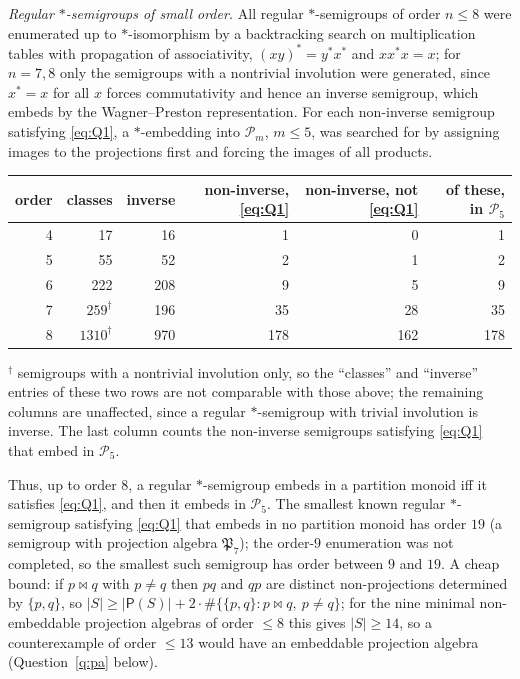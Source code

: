 \documentclass[11pt]{amsart}
\theoremstyle{definition}
\renewcommand{\P}{\mathcal{P}}      %
\newcommand{\PA}{\mathsf{P}}         %
\newcommand{\mt}{\bowtie}      %
\begin{document}
\emph{Regular $*$-semigroups of small order.} All regular $*$-semigroups of order $n\le8$ were enumerated up to $*$-isomorphism by a backtracking search on multiplication tables with propagation of associativity, $(xy)^*=y^*x^*$ and $xx^*x=x$; for $n=7,8$ only the semigroups with a nontrivial involution were generated, since $x^*=x$ for all $x$ forces commutativity and hence an inverse semigroup, which embeds by the Wagner--Preston representation. For each non-inverse semigroup satisfying \eqref{eq:Q1}, a $*$-embedding into $\P_m$, $m\le5$, was searched for by assigning images to the projections first and forcing the images of all products.
\begin{center}
\begin{tabular}{@{}rrrrrr@{}}
\toprule
order & classes & inverse & non-inverse, \eqref{eq:Q1} & non-inverse, not \eqref{eq:Q1} & of these, in $\P_5$\\
\midrule
4 & 17 & 16 & 1 & 0 & 1\\
5 & 55 & 52 & 2 & 1 & 2\\
6 & 222 & 208 & 9 & 5 & 9\\
7 & $259^{\dagger}$ & 196 & 35 & 28 & 35\\
8 & $1310^{\dagger}$ & 970 & 178 & 162 & 178\\
\bottomrule
\end{tabular}

\smallskip
{\small $^\dagger$ semigroups with a nontrivial involution only, so the ``classes'' and ``inverse'' entries of these two rows are not comparable with those above; the remaining columns are unaffected, since a regular $*$-semigroup with trivial involution is inverse. The last column counts the non-inverse semigroups satisfying \eqref{eq:Q1} that embed in $\P_5$.}
\end{center}
Thus, up to order $8$, a regular $*$-semigroup embeds in a partition monoid iff it satisfies \eqref{eq:Q1}, and then it embeds in $\P_5$. The smallest known regular $*$-semigroup satisfying \eqref{eq:Q1} that embeds in no partition monoid has order $19$ (a semigroup with projection algebra $\mathfrak P_7$); the order-$9$ enumeration was not completed, so the smallest such semigroup has order between $9$ and $19$. A cheap bound: if $p\mt q$ with $p\ne q$ then $pq$ and $qp$ are distinct non-projections determined by $\{p,q\}$, so $|S|\ge|\PA(S)|+2\cdot\#\{\{p,q\}:p\mt q,\ p\ne q\}$; for the nine minimal non-embeddable projection algebras of order $\le8$ this gives $|S|\ge14$, so a counterexample of order $\le13$ would have an embeddable projection algebra (Question~\ref{q:pa} below).
\end{document}
